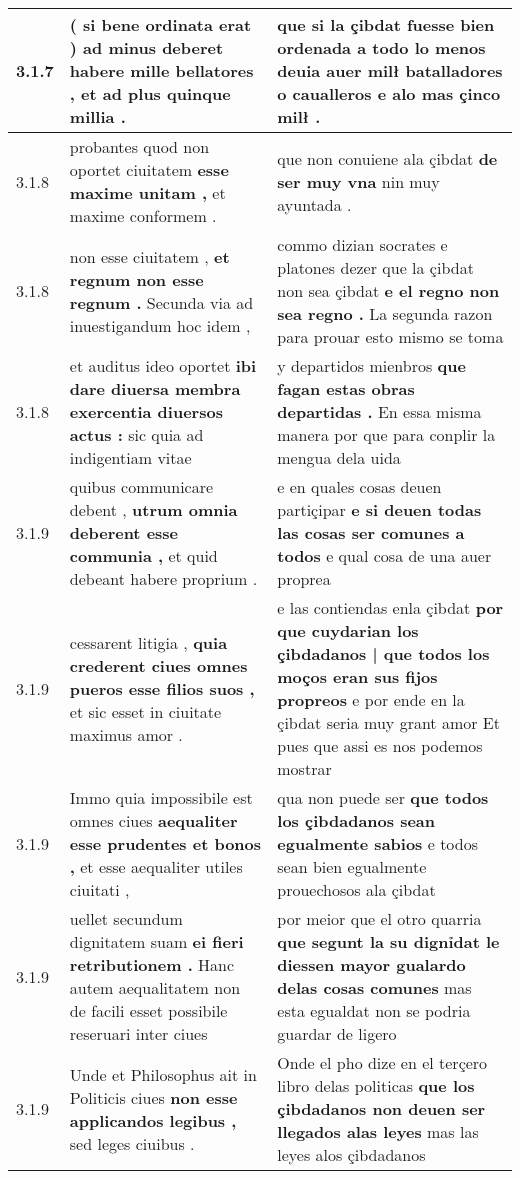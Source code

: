 \begin{tabular}{|p{1cm}|p{6.5cm}|p{6.5cm}|}
3.1.7 & ( si bene ordinata erat ) \textbf{ ad minus deberet habere mille bellatores , } et ad plus quinque millia . & que si la çibdat fuesse bien ordenada \textbf{ a todo lo menos deuia auer milł batalladores o caualleros } e alo mas çinco milł . \\\hline
3.1.8 & probantes quod non oportet ciuitatem \textbf{ esse maxime unitam , } et maxime conformem . & que non conuiene ala çibdat \textbf{ de ser muy vna } nin muy ayuntada . \\\hline
3.1.8 & non esse ciuitatem , \textbf{ et regnum non esse regnum . } Secunda via ad inuestigandum hoc idem , & commo dizian socrates e platones dezer que la çibdat non sea çibdat \textbf{ e el regno non sea regno . } La segunda razon para prouar esto mismo se toma \\\hline
3.1.8 & et auditus ideo oportet \textbf{ ibi dare diuersa membra exercentia diuersos actus : } sic quia ad indigentiam vitae & y departidos mienbros \textbf{ que fagan estas obras departidas . } En essa misma manera por que para conplir la mengua dela uida \\\hline
3.1.9 & quibus communicare debent , \textbf{ utrum omnia deberent esse communia , } et quid debeant habere proprium . & e en quales cosas deuen partiçipar \textbf{ e si deuen todas las cosas ser comunes a todos } e qual cosa de una auer proprea \\\hline
3.1.9 & cessarent litigia , \textbf{ quia crederent ciues omnes pueros esse filios suos , } et sic esset in ciuitate maximus amor . & e las contiendas enla çibdat \textbf{ por que cuydarian los çibdadanos | que todos los moços eran sus fijos propreos } e por ende en la çibdat seria muy grant amor Et pues que assi es nos podemos mostrar \\\hline
3.1.9 & Immo quia impossibile est omnes ciues \textbf{ aequaliter esse prudentes et bonos , } et esse aequaliter utiles ciuitati , & qua non puede ser \textbf{ que todos los çibdadanos sean egualmente sabios } e todos sean bien egualmente prouechosos ala çibdat \\\hline
3.1.9 & uellet secundum dignitatem suam \textbf{ ei fieri retributionem . } Hanc autem aequalitatem non de facili esset possibile reseruari inter ciues & por meior que el otro quarria \textbf{ que segunt la su dignỉdat le diessen mayor gualardo delas cosas comunes } mas esta egualdat non se podria guardar de ligero \\\hline
3.1.9 & Unde et Philosophus ait in Politicis ciues \textbf{ non esse applicandos legibus , } sed leges ciuibus . & Onde el pho dize en el terçero libro delas politicas \textbf{ que los çibdadanos non deuen ser llegados alas leyes } mas las leyes alos çibdadanos \\\hline

\end{tabular}
